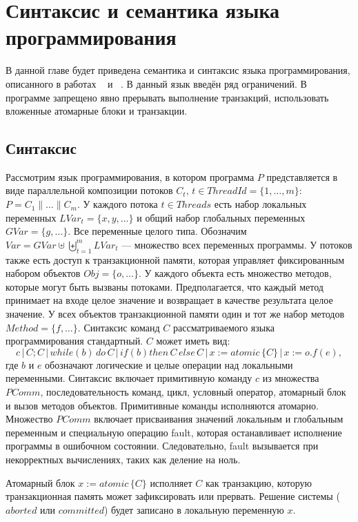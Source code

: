 \chapter{Синтаксис и семантика языка программирования}
В данной главе будет приведена семантика и синтаксис языка программирования, описанного в работах ~\cite{tms_article} и ~\cite{opacity_article}. В данный язык введён ряд ограничений. В программе запрещено явно прерывать выполнение транзакций, использовать вложенные атомарные блоки и транзакции. 

\section{Синтаксис}
Рассмотрим язык программирования, в котором программа $P$ представляется в виде параллельной композиции потоков  $C_t,\, t \in ThreadId=\{1, \ldots, m \}$: $P = C_1 \parallel \ldots \parallel C_m$. У каждого потока $t \in Threads$ есть набор локальных переменных $LVar_t = \{x,y, \ldots \}$ и общий набор глобальных переменных $GVar = \{g, \ldots \}$. Все переменные целого типа. Обозначим  $Var = GVar \uplus \biguplus_{t = 1}^m LVar_{t}$ --- множество всех переменных программы. У потоков также есть доступ к транзакционной памяти, которая управляет фиксированным набором объектов $Obj = \{o, \ldots \}$. У каждого объекта есть множество методов, которые могут быть вызваны потоками. Предполагается, что каждый метод принимает на входе целое значение и возвращает в качестве результата целое значение. У всех объектов транзакционной памяти один и тот же набор методов $Method = \{f, \ldots \}$. Синтаксис команд $C$ рассматриваемого языка программирования стандартный. $C$ может иметь вид: $$ c \,|\, C;C \,|\, while \left (b\right) \, do \, C \,|\, if \left (b\right) then \, C\, else \, C \, | \, x := atomic \, \{ C \} \, | \, x := o.f(e), $$ где $b$ и $e$ обозначают логические и целые операции над локальными переменными. Синтаксис включает примитивную команду $c$ из множества $PComm$, последовательность команд, цикл, условный оператор, атомарный блок и вызов методов объектов. Примитивные команды исполняются атомарно. Множество $PComm$ включает присваивания значений локальным и глобальным переменным и специальную операцию fault, которая останавливает исполнение программы в ошибочном состоянии. Следовательно, fault вызывается при некорректных вычислениях, таких как деление на ноль.

Атомарный блок $x := atomic \, \{C\}$ исполняет $C$ как транзакцию, которую транзакционная память может зафиксировать или прервать. Решение системы ($aborted$ или $committed$) будет записано в локальную переменную $x$. 

